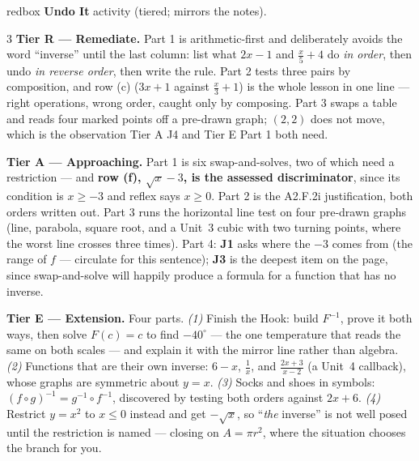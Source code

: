 \documentclass[10pt]{article}
\begin{document}
\begin{skillbox}{redbox}
\textbf{Undo It} activity (tiered; mirrors the notes).
\begin{multicols}{3}
\textbf{Tier R --- Remediate.} Part 1 is arithmetic-first and deliberately avoids the word
``inverse'' until the last column: list what $2x-1$ and $\frac{x}{5}+4$ do \emph{in order}, then undo
\emph{in reverse order}, then write the rule. Part 2 tests three pairs by composition, and row (c)
($3x+1$ against $\frac{x}{3}+1$) is the whole lesson in one line --- right operations, wrong order,
caught only by composing. Part 3 swaps a table and reads four marked points off a pre-drawn graph;
$(2,2)$ does not move, which is the observation Tier A J4 and Tier E Part 1 both need.

\columnbreak
\textbf{Tier A --- Approaching.} Part 1 is six swap-and-solves, two of which need a restriction ---
and \textbf{row (f), $\sqrt{x}-3$, is the assessed discriminator}, since its condition is $x\ge-3$
and reflex says $x\ge0$. Part 2 is the A2.F.2i justification, both orders written out. Part 3 runs
the horizontal line test on four pre-drawn graphs (line, parabola, square root, and a Unit~3 cubic
with two turning points, where the worst line crosses three times). Part 4: \textbf{J1} asks where
the $-3$ comes from (the range of $f$ --- circulate for this sentence); \textbf{J3} is the deepest
item on the page, since swap-and-solve will happily produce a formula for a function that has no
inverse.

\columnbreak
\textbf{Tier E --- Extension.} Four parts. \emph{(1)} Finish the Hook: build $F^{-1}$, prove it both
ways, then solve $F(c)=c$ to find $-40^{\circ}$ --- the one temperature that reads the same on both
scales --- and explain it with the mirror line rather than algebra. \emph{(2)} Functions that are
their own inverse: $6-x$, $\frac1x$, and $\frac{2x+3}{x-2}$ (a Unit~4 callback), whose graphs are
symmetric about $y=x$. \emph{(3)} Socks and shoes in symbols: $(f\circ g)^{-1}=g^{-1}\circ f^{-1}$,
discovered by testing both orders against $2x+6$. \emph{(4)} Restrict $y=x^{2}$ to $x\le0$ instead
and get $-\sqrt{x}$, so ``\emph{the} inverse'' is not well posed until the restriction is named ---
closing on $A=\pi r^{2}$, where the situation chooses the branch for you.
\end{multicols}
\end{skillbox}
\end{document}
